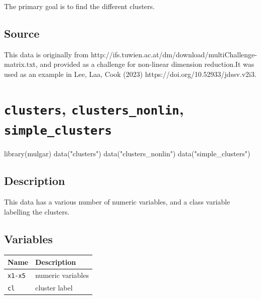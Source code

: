 \documentclass[
  letterpaper,
]{krantz}
\newenvironment{Shaded}{\begin{snugshade}}{\end{snugshade}}
\newcommand{\FunctionTok}[1]{\textcolor[rgb]{0.28,0.35,0.67}{#1}}
\newcommand{\NormalTok}[1]{\textcolor[rgb]{0.00,0.23,0.31}{#1}}
\newcommand{\StringTok}[1]{\textcolor[rgb]{0.13,0.47,0.30}{#1}}
\begin{document}
The primary goal is to find the different clusters.

\subsection*{Source}\label{source-6}

This data is originally from
http://ifs.tuwien.ac.at/dm/download/multiChallenge-matrix.txt, and
provided as a challenge for non-linear dimension reduction.It was used
as an example in Lee, Laa, Cook (2023)
https://doi.org/10.52933/jdssv.v2i3.

\section{\texorpdfstring{\texttt{clusters}, \texttt{clusters\_nonlin},
\texttt{simple\_clusters}}{clusters, clusters\_nonlin, simple\_clusters}}\label{clusters-clusters_nonlin-simple_clusters}

\begin{Shaded}
\begin{Highlighting}[]
\FunctionTok{library}\NormalTok{(mulgar)}
\FunctionTok{data}\NormalTok{(}\StringTok{"clusters"}\NormalTok{)}
\FunctionTok{data}\NormalTok{(}\StringTok{"clusters\_nonlin"}\NormalTok{)}
\FunctionTok{data}\NormalTok{(}\StringTok{"simple\_clusters"}\NormalTok{)}
\end{Highlighting}
\end{Shaded}

\subsection*{Description}\label{description-7}

This data has a various number of numeric variables, and a class
variable labelling the clusters.

\subsection*{Variables}\label{variables-7}

\begin{longtable}[]{@{}ll@{}}
\toprule\noalign{}
Name & Description \\
\midrule\noalign{}
\endhead
\bottomrule\noalign{}
\endlastfoot
\texttt{x1-x5} & numeric variables \\
\texttt{cl} & cluster label \\
\end{longtable}
\end{document}
